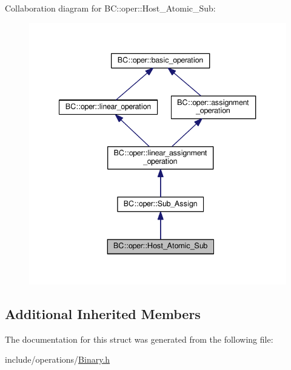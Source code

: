 Collaboration diagram for BC\+:\+:oper\+:\+:Host\+\_\+\+Atomic\+\_\+\+Sub\+:
\nopagebreak
\begin{figure}[H]
\begin{center}
\leavevmode
\includegraphics[width=340pt]{structBC_1_1oper_1_1Host__Atomic__Sub__coll__graph}
\end{center}
\end{figure}
\subsection*{Additional Inherited Members}


The documentation for this struct was generated from the following file\+:\begin{DoxyCompactItemize}
\item 
include/operations/\hyperlink{Binary_8h}{Binary.\+h}\end{DoxyCompactItemize}

